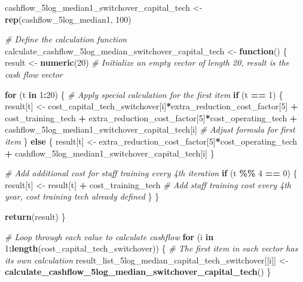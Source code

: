 \documentclass[
]{article}
\newenvironment{Shaded}{\begin{snugshade}}{\end{snugshade}}
\newcommand{\CommentTok}[1]{\textcolor[rgb]{0.56,0.35,0.01}{\textit{#1}}}
\newcommand{\ControlFlowTok}[1]{\textcolor[rgb]{0.13,0.29,0.53}{\textbf{#1}}}
\newcommand{\DecValTok}[1]{\textcolor[rgb]{0.00,0.00,0.81}{#1}}
\newcommand{\FunctionTok}[1]{\textcolor[rgb]{0.13,0.29,0.53}{\textbf{#1}}}
\newcommand{\NormalTok}[1]{#1}
\newcommand{\OtherTok}[1]{\textcolor[rgb]{0.56,0.35,0.01}{#1}}
\newcommand{\SpecialCharTok}[1]{\textcolor[rgb]{0.81,0.36,0.00}{\textbf{#1}}}
\begin{document}
\begin{Shaded}
\begin{Highlighting}[]
\NormalTok{cashflow\_5log\_median1\_switchover\_capital\_tech }\OtherTok{\textless{}{-}} \FunctionTok{rep}\NormalTok{(cashflow\_5log\_median1, }\DecValTok{100}\NormalTok{)}

\CommentTok{\# Define the calculation function}
\NormalTok{calculate\_cashflow\_5log\_median\_switchover\_capital\_tech }\OtherTok{\textless{}{-}} \ControlFlowTok{function}\NormalTok{() \{}
\NormalTok{  result }\OtherTok{\textless{}{-}} \FunctionTok{numeric}\NormalTok{(}\DecValTok{20}\NormalTok{)  }\CommentTok{\# Initialize an empty vector of length 20, result is the cash flow vector}
  
  \ControlFlowTok{for}\NormalTok{ (t }\ControlFlowTok{in} \DecValTok{1}\SpecialCharTok{:}\DecValTok{20}\NormalTok{) \{}
    \CommentTok{\# Apply special calculation for the first item}
    \ControlFlowTok{if}\NormalTok{ (t }\SpecialCharTok{==} \DecValTok{1}\NormalTok{) \{}
\NormalTok{      result[t] }\OtherTok{\textless{}{-}}\NormalTok{ cost\_capital\_tech\_switchover[i]}\SpecialCharTok{*}\NormalTok{extra\_reduction\_cost\_factor[}\DecValTok{5}\NormalTok{] }\SpecialCharTok{+}\NormalTok{ cost\_training\_tech }\SpecialCharTok{+}\NormalTok{ extra\_reduction\_cost\_factor[}\DecValTok{5}\NormalTok{]}\SpecialCharTok{*}\NormalTok{cost\_operating\_tech }\SpecialCharTok{+}\NormalTok{ cashflow\_5log\_median1\_switchover\_capital\_tech[i] }\CommentTok{\# Adjust formula for first item}
\NormalTok{    \} }\ControlFlowTok{else}\NormalTok{ \{}
\NormalTok{      result[t] }\OtherTok{\textless{}{-}}\NormalTok{ extra\_reduction\_cost\_factor[}\DecValTok{5}\NormalTok{]}\SpecialCharTok{*}\NormalTok{cost\_operating\_tech }\SpecialCharTok{+}\NormalTok{ cashflow\_5log\_median1\_switchover\_capital\_tech[i]}
\NormalTok{    \}}
    
    \CommentTok{\# Add additional cost for staff training every 4th iteration}
    \ControlFlowTok{if}\NormalTok{ (t }\SpecialCharTok{\%\%} \DecValTok{4} \SpecialCharTok{==} \DecValTok{0}\NormalTok{) \{}
\NormalTok{      result[t] }\OtherTok{\textless{}{-}}\NormalTok{ result[t] }\SpecialCharTok{+}\NormalTok{ cost\_training\_tech  }\CommentTok{\# Add staff training cost every 4th year, cost training tech already defined}
\NormalTok{    \}}
\NormalTok{  \}}
  
  \FunctionTok{return}\NormalTok{(result)}
\NormalTok{\}}

\CommentTok{\# Loop through each value to calculate cashflow}
\ControlFlowTok{for}\NormalTok{ (i }\ControlFlowTok{in} \DecValTok{1}\SpecialCharTok{:}\FunctionTok{length}\NormalTok{(cost\_capital\_tech\_switchover)) \{}
  \CommentTok{\# The first item in each vector has its own calculation}
\NormalTok{  result\_list\_5log\_median\_capital\_tech\_switchover[[i]] }\OtherTok{\textless{}{-}} \FunctionTok{calculate\_cashflow\_5log\_median\_switchover\_capital\_tech}\NormalTok{()}
\NormalTok{\}}




\end{Highlighting}
\end{Shaded}
\end{document}
